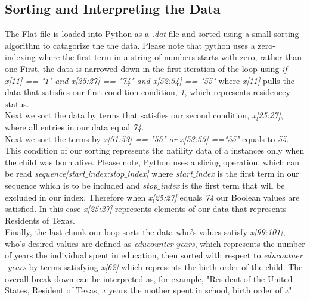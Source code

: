\documentclass[10pt]{article}
\begin{document}
\subsection{Sorting and Interpreting the Data}
The Flat file is loaded into Python as a \emph{.dat} file and sorted using a small sorting algorithm to catagorize the the data. Please
note that python uses a zero-indexing where the first term in a string of numbers starts with zero, rather than one
First, the data is narrowed down in the first iteration of the loop using \emph{if x[11] == "1" and x[25:27] == "74" and x[52:54] == "55"} where \emph{x[11]}
pulls the data that satisfies our first condition condition, \emph{1}, which represents residencey status. \\Next we sort the data by terms
that satisfies our second condition, \emph{x[25:27]}, where all entries in our data equal \emph{74}. \\ Next we sort the terms by \emph{x[51:53] == "55" or x[53:55] =="55"} equals to \emph{55}.
This condition of our sorting represents the natility data of a instances only when the child was born alive.  Please note, Python uses a slicing 
operation, which can be read \emph{sequence[start$\_$index:stop$\_$index]} where \emph{start$\_$index} is the first term in our sequence which is to be 
included and \emph{stop$\_$index} is the first term that will be excluded in our index. Therefore when \emph{x[25:27]} equals \emph{74} our
Boolean values are satisfied. In this case \emph{x[25:27]} represents elements of our data that represents Residents of Texas. \\Finally, the last 
chunk our loop sorts the data who's values satisfy \emph{x[99:101]}, who's desired values are defined as \emph{educounter$\_$years}, which 
represents the number of years the individual spent in education, then sorted with respect to \emph{educoutner$\_$years} by terms satisfying \emph{x[62]} which represents
the birth order of the child. The overall break down can be interpreted as, for example, "Resident of the United States, Resident of Texas,
\emph{x} years the mother spent in school, birth order of \emph{x}"
\end{document}
